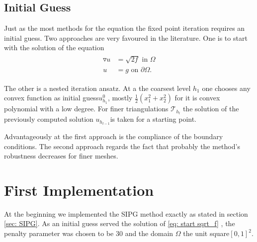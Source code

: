 \subsection{Initial Guess}
Just as the most methods for the \MA equation the fixed point iteration requires an initial guess. Two approaches are very favoured in the literature.
One is to start with the solution of the equation
\begin{align}
	\begin{split}
	\triangledown u &= \sqrt{2f} \text{ in } \Omega \\ 
	u &= g \text{ on }\partial \Omega.
	\end{split}\label{eq: start sqrt_f}
\end{align}


The other is a nested iteration ansatz. At a the coarsest level $h_1$ one chooses any convex function as initial guess$u^0_{h_1}$, mostly $\frac 1 2 ({x_1^2} + {x_2^2}) $ for it is convex polynomial with a low degree. For finer triangulations $\mathcal{T}_{h_{l}}$ the solution of the previously computed solution $u_{h_{l-1}}$is taken for a starting point.

Advantageously at the first approach is the compliance of the boundary conditions.
The second approach regards the fact that probably the method's robustness decreases for finer meshes.


\section{First Implementation}
At the beginning we implemented the SIPG method exactly as stated in section \ref{sec: SIPG}.
As an initial guess served the solution of \eqref{eq: start sqrt_f} , the penalty parameter was chosen to be 30 and the domain $\Omega$ the unit square$[0,1]^2$.

